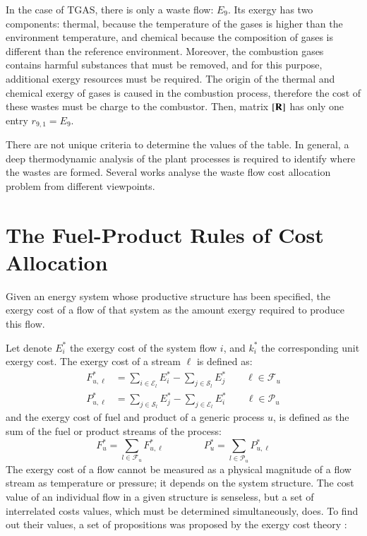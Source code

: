 \documentclass{ecos2018}
\begin{document}
In the case of TGAS, there is only a waste flow: $E_9$. Its exergy has two components: thermal, because the  temperature of the gases is higher than the environment temperature, and chemical because the composition of gases is different than the reference environment. Moreover, the combustion gases contains harmful substances that must be removed, and for this purpose, additional exergy resources must be required. The origin of the thermal and chemical exergy of gases is caused in the combustion process, therefore the cost of these wastes must be charge to the combustor. Then, matrix $\left[ \textbf{R} \right]$ has only one entry $r_{9,1}=E_9$.

There are not unique criteria to determine the values of the  table. In general, a deep thermodynamic analysis of the plant processes is required to identify where the wastes are formed. Several works \cite{Frangopoulos87,Gonzalez03,Mendes17} analyse the waste flow cost allocation problem from different viewpoints.

\section{The Fuel-Product Rules of Cost Allocation}
Given an energy system whose productive structure has been specified, the exergy cost of a flow of that system as the amount exergy required to produce this flow.

Let denote $E_i^*$ the exergy cost of the system flow $i$, and $k_i^*$ the corresponding unit exergy cost. The exergy cost of a stream $\ell$ is defined as:
\begin{align}
F_{u,\ell}^{*}&=\sum_{i\in\mathcal{E}_l}{E_i^*}-\sum_{j\in\mathcal{S}_l}{E_j^*} \qquad \ell\in\mathcal{F}_u \\
P_{u,\ell}^{*}&=\sum_{j\in\mathcal{S}_l}{E_j^*}-\sum_{j\in\mathcal{E}_l}{E_i^*} \qquad \ell\in\mathcal{P}_u
\end{align}
and the exergy cost of fuel and product of a generic process $u$, is defined as the sum of the fuel or product streams of the process:
\begin{equation}
F_{u}^{*}=\sum_{l\in\mathcal{F}_u}{F_{u,\ell}^{*}} \qquad \qquad
P_{u}^{*}=\sum_{l\in\mathcal{P}_u}{P_{u,\ell}^{*}}
\end{equation}
The exergy cost of a flow cannot be measured as a physical magnitude of a flow stream as temperature or pressure; it depends on the system structure. The cost value of an individual flow in a given structure is senseless, but a set of interrelated costs values, which must be determined simultaneously, does. To find out their values, a set of propositions was proposed by the exergy cost theory \cite{Valero1986}:
\end{document}
